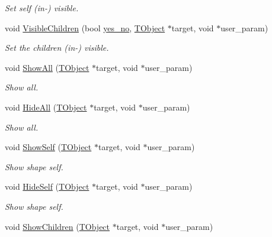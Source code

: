\begin{DoxyCompactItemize}
\begin{DoxyCompactList}\small\item\em Set self (in-\/) visible. \end{DoxyCompactList}\item 
void \hyperlink{class_d_d4hep_1_1_eve_user_context_menu_acf1a858a9cb9c8ba26bd351300a53a3c}{Visible\+Children} (bool \hyperlink{namespace_d_d4hep_a9b6e2c5ab00340e93017e18604b0cb85}{yes\+\_\+no}, \hyperlink{class_t_object}{T\+Object} $\ast$target, void $\ast$user\+\_\+param)
\begin{DoxyCompactList}\small\item\em Set the children (in-\/) visible. \end{DoxyCompactList}\item 
void \hyperlink{class_d_d4hep_1_1_eve_user_context_menu_a0ee719ceeea4256e11c3381657df7c24}{Show\+All} (\hyperlink{class_t_object}{T\+Object} $\ast$target, void $\ast$user\+\_\+param)
\begin{DoxyCompactList}\small\item\em Show all. \end{DoxyCompactList}\item 
void \hyperlink{class_d_d4hep_1_1_eve_user_context_menu_a9aad9343ba738d4e4fdbfe80ecdcec4e}{Hide\+All} (\hyperlink{class_t_object}{T\+Object} $\ast$target, void $\ast$user\+\_\+param)
\begin{DoxyCompactList}\small\item\em Show all. \end{DoxyCompactList}\item 
void \hyperlink{class_d_d4hep_1_1_eve_user_context_menu_a38b76e87d1f304a24dc46692090c9c7f}{Show\+Self} (\hyperlink{class_t_object}{T\+Object} $\ast$target, void $\ast$user\+\_\+param)
\begin{DoxyCompactList}\small\item\em Show shape self. \end{DoxyCompactList}\item 
void \hyperlink{class_d_d4hep_1_1_eve_user_context_menu_afdf1b8efe4a72dd81ec77f0b49b36b0c}{Hide\+Self} (\hyperlink{class_t_object}{T\+Object} $\ast$target, void $\ast$user\+\_\+param)
\begin{DoxyCompactList}\small\item\em Show shape self. \end{DoxyCompactList}\item 
void \hyperlink{class_d_d4hep_1_1_eve_user_context_menu_a246160e0e92283c590666845eea452e9}{Show\+Children} (\hyperlink{class_t_object}{T\+Object} $\ast$target, void $\ast$user\+\_\+param)

\end{DoxyCompactItemize}
